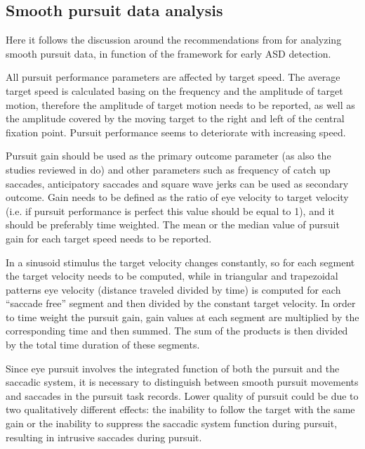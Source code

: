 \subsection{Smooth pursuit data analysis}
\label{sec:fwksmoothpursuitanalysis}

Here it follows the discussion around the recommendations from \cite{smyrnis2008guidelines} for analyzing smooth pursuit data, in function of the framework for early ASD detection.

All pursuit performance parameters are affected by target speed. The average target speed is calculated basing on the frequency and the amplitude of target motion, therefore the amplitude of target motion needs to be reported, as well as the amplitude covered by the moving target to the right and left of the central fixation point. Pursuit performance seems to deteriorate with increasing speed.

Pursuit gain should be used as the primary outcome parameter (as also the studies reviewed in  do) and other parameters such as frequency of catch up saccades, anticipatory saccades and square wave jerks can be used as secondary outcome. Gain needs to be defined as the ratio of eye velocity to target velocity (i.e. if pursuit performance is perfect this value should be equal to 1), and it should be preferably time weighted. The mean or the median value of pursuit gain for each target speed needs to be reported.

In a sinusoid stimulus the target velocity changes constantly, so for each segment the target velocity needs to be computed, while in triangular and trapezoidal patterns eye velocity (distance traveled divided by time) is computed for each “saccade free” segment and then divided by the constant target velocity. In order to time weight the pursuit gain, gain values at each segment are multiplied by the corresponding time and then summed. The sum of the products is then divided by the total time duration of these segments.

Since eye pursuit involves the integrated function of both the pursuit and the saccadic system, it is necessary to distinguish between smooth pursuit movements and saccades in the pursuit task records. Lower quality of pursuit could be due to two qualitatively different effects: the inability to follow the target with the same gain or the inability to suppress the saccadic system function during pursuit, resulting in intrusive saccades during pursuit.

